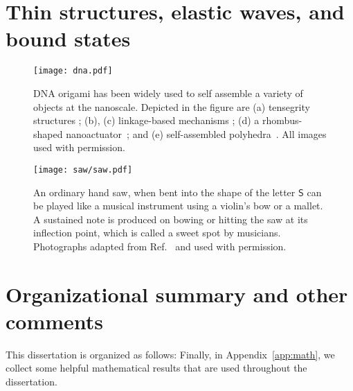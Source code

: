 \section{Thin structures, elastic waves, and bound states}

\begin{figure}
  \begin{center}
    \texttt{[image: dna.pdf]}
  \end{center}
  \caption{DNA origami has been widely used to self assemble a variety of objects at the nanoscale.
    Depicted in the figure are (a) tensegrity structures \cite{liedl2010}; (b), (c) linkage-based mechanisms \cite{marras2015,zhou2015}; (d) a rhombus-shaped nanoactuator~\cite{ke2016}; and (e) self-assembled polyhedra~\cite{iinuma2014}.  All images used with permission.}
  \label{fig:dna_origami}
\end{figure}

\begin{figure}
  \begin{center}
    \texttt{[image: saw/saw.pdf]}
  \end{center}
  \caption{%
    An ordinary hand saw, when bent into the shape of the letter $\mathsf{S}$ can be played like a musical instrument using a violin's bow or a mallet.
    A sustained note is produced on bowing or hitting the saw at its inflection point, which is called a sweet spot by musicians.
    Photographs adapted from Ref.~\cite{shankar2022} and used with permission.
  }
  \label{fig:saw}
\end{figure}

\section{Organizational summary and other comments}

This dissertation is organized as follows:
Finally, in Appendix~\ref{app:math}, we collect some helpful mathematical results that are used throughout the dissertation.
